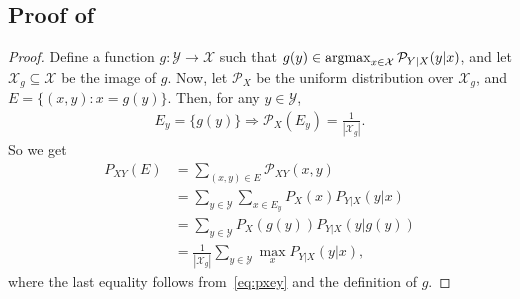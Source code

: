 \documentclass{article}
\numberwithin{theorem}{section}
\numberwithin{example}{section}
\numberwithin{remark}{section}
\numberwithin{definition}{section}
\newcommand{\Pm}{\mathcal{P}}
\newcommand{\X}{\mathcal{X}}
\newcommand{\Y}{\mathcal{Y}}
\newcommand{\argmax}{\operatornamewithlimits{argmax}}
\begin{document}
\subsection{Proof of~} \label{app:MLboundtightness}
\begin{proof}
 Define a function $g: \Y \rightarrow \X$ such that $g(y) \in \argmax_{x \in \X} \Pm_{Y|X} (y|x)$, and let $\X_g \subseteq \X$ be the image of $g$. Now, let $\Pm_X$ be the uniform distribution over $\X_g $, and $E = \{ (x,y): x=g(y) \}$. Then, for any $y \in \Y$, 
\begin{align} \label{eq:pxey}
 E_y = \{ g(y) \} \Rightarrow \Pm_X(E_y)  = \frac{1}{|\X_g|}. 
\end{align}
So we get 
\begin{align}
P_{XY} (E) & = \sum_{(x,y) \in E} \Pm_{XY}(x,y) \\
& = \sum_{y \in \Y} \sum_{x \in E_y} P_{X} (x) P_{Y|X} (y|x) \\
& = \sum_{y \in \Y} P_X(g(y)) P_{Y|X} (y| g(y) ) \\
& = \frac{1}{|\X_g|} \sum_{y \in \Y} \max_x P_{Y|X} (y|x),
\end{align}
where the last equality follows from~\eqref{eq:pxey} and the definition of $g$.
\end{proof}
\end{document}
